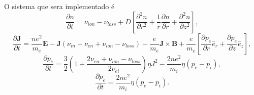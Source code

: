\begin{frame}
\begin{equation}
\end{equation}
O sistema que sera implementado é
\begin{equation}
\label{contfinal} 
\frac{\partial n}{\partial t} = \nu_{ion} - \nu_{loss}+D \left[  \frac{\partial^2 n}{\partial r^2} + \frac{1}{r} \frac{\partial n}{\partial r}  + \frac{\partial^2 n}{\partial z^2} \right] ,
\end{equation}
\begin{equation}
\frac{\partial \bm{J}}{\partial t} =  \frac{ne^2}{m_e} \bm{E} -\bm{J}(\nu_{in}+\nu_{en}+\nu_{ion}-\nu_{loss}) -\frac{e}{m_e}\bm{J} \times \bm{B}+\frac{e}{m_e} \left[ \frac{\partial p_e}{\partial r} \hat{e}_r + \frac{\partial p_e}{\partial z} \hat{e}_z \right],
\end{equation}
\begin{equation}
\frac{\partial p_e}{\partial t} = \frac{3}{2}(1+\frac{2 \nu_{en} + \nu_{ion} - \nu_{loss}}{2\nu_{ei}})\eta J^2  -\frac{2ne^2}{m_i} \eta (p_e-p_i),
\end{equation}
\begin{equation}
\frac{\partial p_e}{\partial t} = \frac{2ne^2}{m_i}\eta(p_e-p_i) .
\end{equation}



\end{frame}
